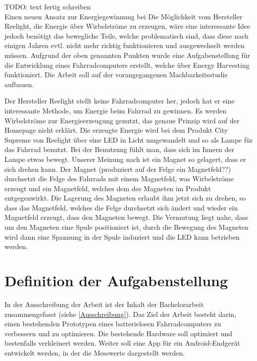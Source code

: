 TODO: text fertig schreiben\\
Einen neuen Ansatz zur Energiegewinnung bei
Die Möglichkeit vom Hersteller Reelight, die Energie über Wirbelströme zu erzeugen, wäre eine interessante Idee jedoch benötigt das bewegliche Teile, welche problematisch sind, dass diese nach einigen Jahren evtl. nicht mehr richtig funktionieren und ausgewechselt werden müssen. Aufgrund der oben genannten Punkten wurde eine Aufgabenstellung für die Entwicklung eines Fahrradcomputers erstellt, welche über Energy Harvesting funktioniert. Die Arbeit soll auf der vorangegangenen Machbarkeitsstudie aufbauen.

Der Hersteller Reelight stellt keine Fahrradcomputer her, jedoch hat er eine interessante Methode, um Energie beim Fahrrad zu gewinnen. Es werden Wirbelströme zur Energieerzeugung genutzt, das genaue Prinzip wird auf der Homepage nicht erklärt. Die erzeugte Energie wird bei dem Produkt City Supreme von Reelight über eine LED in Licht umgewandelt und so als Lampe für das Fahrrad benutzt. Bei der Benutzung fühlt man, dass sich im Innern der Lampe etwas bewegt. Unserer Meinung nach ist ein Magnet so gelagert, dass er sich drehen kann. Der Magnet (produziert auf der Felge ein Magnetfeld??) durchsetzt die Felge des Fahrrads mit einem Magnetfeld, was Wirbelströme erzeugt und ein Magnetfeld, welches dem des Magneten im Produkt entgegenwirkt. Die Lagerung des Magneten erlaubt ihm jetzt sich zu drehen, so dass das Magnetfeld, welches die Felge durchsetzt sich ändert und wieder ein Magnetfeld erzeugt, dass den Magneten bewegt. Die Vermutung liegt nahe, dass um den Magneten eine Spule positioniert ist, durch die Bewegung des Magneten wird dann eine Spannung in der Spule induziert und die LED kann betrieben werden.\\



\section{Definition der Aufgabenstellung}\label{Aufgabenstellung} 
In der Ausschreibung der Arbeit ist der Inhalt der Bachelorarbeit zusammengefasst (siehe \ref{Ausschreibung}). Das Ziel der Arbeit besteht darin, einen bestehenden Prototypen eines batterielosen Fahrradcomputers zu verbessern und zu optimieren. Die bestehende Hardware soll optimiert und bestenfalls verkleinert werden. Weiter soll eine App für ein Android-Endgerät entwickelt werden, in der die Messwerte dargestellt werden.

